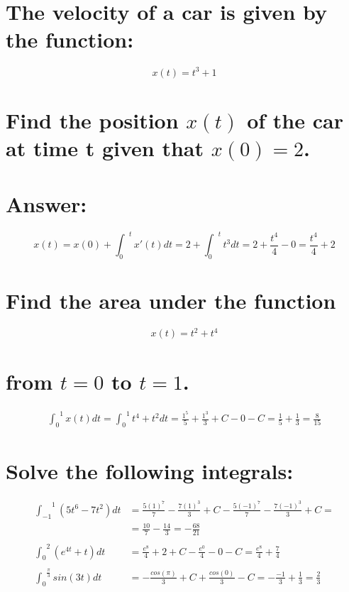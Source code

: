 \documentclass{article}
\begin{document}
\section{\normalfont The velocity of a car is given by the function:}

\begin{equation}
x(t) = t^3 + 1
\end{equation}

\section*{\normalfont Find the position $x(t)$ of the car at time t given that $x(0) = 2$.}

\section*{Answer:}

\begin{equation}
x(t) = x(0) + {\int_{0}}^t x'(t) dt = 2 + {\int_{0}}^t t^3 dt = 2 + \frac{t^4}{4} - 0 = \frac{t^4}{4} + 2
\end{equation}

\section{\normalfont Find the area under the function}

\begin{equation}
x(t) = t^2 + t^4
\end{equation}

\section*{\normalfont from $t=0$ to $t=1$.}

\begin{equation}
\begin{split}
{\int_0}^1 x(t) dt = {\int_0}^1 t^4 + t^2 dt = \frac{1^5}{5} + \frac{1^3}{3} + C - 0 - C = \frac{1}{5} + \frac{1}{3} = \frac{8}{15}
\end{split}
\end{equation}

\section{\normalfont Solve the following integrals:}

\begin{equation}
\begin{split}
{\int_{-1}}^1 (5t^6 - 7t^2) dt & = \frac{5(1)^7}{7} - \frac{7(1)^3}{3} + C - \frac{5(-1)^7}{7} - \frac{7(-1)^3}{3} + C = \\ 
& = \frac{10}{7} - \frac{14}{3} = -\frac{68}{21} \\ \\
{\int_0}^2 (e^{4t} + t) dt & = \frac{e^8}{4} + 2 + C - \frac{e^0}{4} - 0 - C = \frac{e^8}{4} + \frac{7}{4} \\ \\
{\int_0}^{\frac{\pi}{3}} sin(3t) dt & = -\frac{cos(\pi)}{3} + C + \frac{cos(0)}{3} - C = -\frac{-1}{3} + \frac{1}{3} = \frac{2}{3}
\end{split}
\end{equation}
\end{document}
